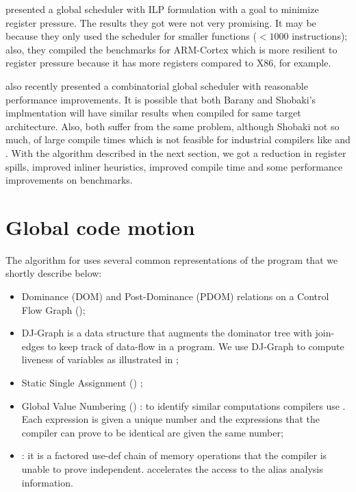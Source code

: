 \documentclass[acmlarge,review,anonymous]{acmart}\settopmatter{printfolios=true}
\begin{document}
\citet{barany2013} presented a global scheduler with ILP formulation with
a goal to minimize register pressure. The results they got were not very
promising. It may be because they only used the scheduler for smaller functions
($<1000$ instructions); also, they compiled the benchmarks for ARM-Cortex which
is more resilient to register pressure because it has more registers compared to
X86, for example.

\citet{shobaki2013} also recently presented a combinatorial global
scheduler with reasonable performance improvements. It is possible that both
Barany and Shobaki's implmentation will have similar results when compiled for
same target architecture. Also, both suffer from the same problem, although
Shobaki not so much, of large compile times which is not feasible for industrial
compilers like \GCC{} and \LLVM{}. With the algorithm described in the next
section, we got a reduction in register spills, improved inliner heuristics,
improved compile time and some performance improvements on \SPEC{} benchmarks.


\section{Global code motion}

The algorithm for \gcm{} uses several common representations of the
program that we shortly describe below:
\begin{itemize}
\item Dominance (DOM) and Post-Dominance (PDOM) relations \cite{dragonbook} on a
  Control Flow Graph (\CFG{});
\item DJ-Graph \cite{Sreedhar1996} is a data structure that augments the
  dominator tree with join-edges to keep track of data-flow in a program. We use
  DJ-Graph to compute liveness of variables as illustrated in \cite{das2012};
\item Static Single Assignment (\SSA{}) \cite{cytron};
\item Global Value Numbering (\GVN{}) \cite{rosen1988global,click1995global}: to
  identify similar computations compilers use \GVN{}.  Each expression is given
  a unique number and the expressions that the compiler can prove to be
  identical are given the same number;
\item \MemorySSA{} \cite{novillo2007memory}: it is a factored use-def chain of
  memory operations that the compiler is unable to prove
  independent. \MemorySSA{} accelerates the access to the alias analysis
  information.
\end{itemize}
\end{document}
